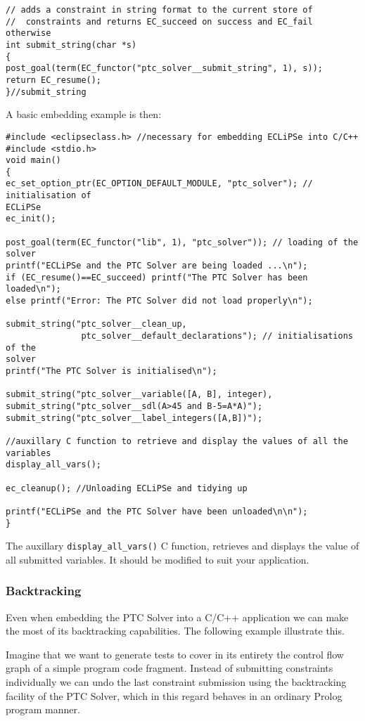 \documentclass{article}
\begin{document}
\begin{verbatim}
// adds a constraint in string format to the current store of
//  constraints and returns EC_succeed on success and EC_fail otherwise
int submit_string(char *s)
{
post_goal(term(EC_functor("ptc_solver__submit_string", 1), s));
return EC_resume();
}//submit_string
\end{verbatim}

A basic embedding example is then:

\begin{verbatim}
#include <eclipseclass.h> //necessary for embedding ECLiPSe into C/C++
#include <stdio.h>
void main()
{
ec_set_option_ptr(EC_OPTION_DEFAULT_MODULE, "ptc_solver"); // initialisation of
ECLiPSe
ec_init();

post_goal(term(EC_functor("lib", 1), "ptc_solver")); // loading of the solver
printf("ECLiPSe and the PTC Solver are being loaded ...\n");
if (EC_resume()==EC_succeed) printf("The PTC Solver has been loaded\n");
else printf("Error: The PTC Solver did not load properly\n");

submit_string("ptc_solver__clean_up,
               ptc_solver__default_declarations"); // initialisations of the
solver
printf("The PTC Solver is initialised\n");

submit_string("ptc_solver__variable([A, B], integer),
submit_string("ptc_solver__sdl(A>45 and B-5=A*A)");
submit_string("ptc_solver__label_integers([A,B])");

//auxillary C function to retrieve and display the values of all the variables
display_all_vars();

ec_cleanup(); //Unloading ECLiPSe and tidying up

printf("ECLiPSe and the PTC Solver have been unloaded\n\n");
}
\end{verbatim}

The auxillary \verb+display_all_vars()+ C function, retrieves and displays the
value of
all submitted variables. It should be modified to suit your application.

\subsubsection{Backtracking}

Even when embedding the PTC Solver into a C/C++ application we can make the
most of its backtracking capabilities. The following example illustrate this.

Imagine that we want to generate tests to cover in its entirety the control flow
graph of a simple program code fragment. Instead of submitting constraints
individually we can undo the last constraint submission using the backtracking
facility of the PTC Solver, which in this regard behaves in an ordinary Prolog
program manner.
\end{document}
